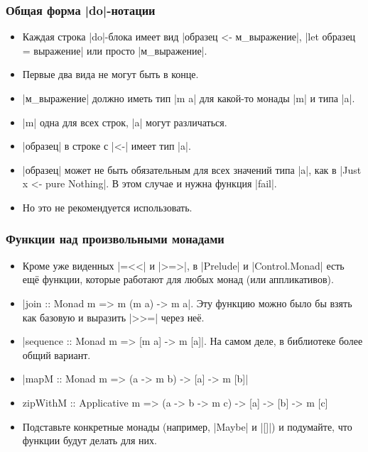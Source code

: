 \documentclass[11pt]{beamer}
\begin{document}
\begin{frame}[fragile]
\frametitle{Общая форма \haskinline|do|-нотации}
\begin{itemize}
    \item Каждая строка \haskinline|do|-блока имеет вид \haskinline|образец <- м_выражение|, \haskinline|let образец = выражение| или просто \haskinline|м_выражение|.
    \item Первые два вида не могут быть в конце.
    \item \haskinline|м_выражение| должно иметь тип \haskinline|m a| для какой-то монады \haskinline|m| и типа \haskinline|a|.
    \item \haskinline|m| одна для всех строк, \haskinline|a| могут различаться.
    \item \haskinline|образец| в строке с \haskinline|<-| имеет тип \haskinline|a|.
    \item \haskinline|образец| может не быть обязательным для всех значений типа \haskinline|a|, как в \haskinline|Just x <- pure Nothing|. В этом случае и нужна функция \haskinline|fail|. 
    \item Но это не рекомендуется использовать.
\end{itemize}
\end{frame}

\begin{frame}[fragile]
\frametitle{Функции над произвольными монадами}
\begin{itemize}[<+->]
    \item Кроме уже виденных \haskinline|=<<| и \haskinline|>=>|, в \haskinline|Prelude| и \haskinline|Control.Monad| есть ещё функции, которые работают для любых монад (или аппликативов).
    \item \haskinline|join :: Monad m => m (m a) -> m a|. Эту функцию можно было бы взять как базовую и выразить \haskinline|>>=| через неё.
    \item \haskinline|sequence :: Monad m => [m a] -> m [a]|. На самом деле, в библиотеке более общий вариант.
    \item \haskinline[fontsize=\small]|mapM :: Monad m => (a -> m b) -> [a] -> m [b]|
    \item
    \begin{haskell}
    zipWithM :: Applicative m =>
      (a -> b -> m c) -> [a] -> [b] -> m [c]
    \end{haskell}
    \item Подставьте конкретные монады (например, \haskinline|Maybe| и \haskinline|[]|) и подумайте, что функции будут делать для них.
\end{itemize}
\end{frame}
\end{document}
